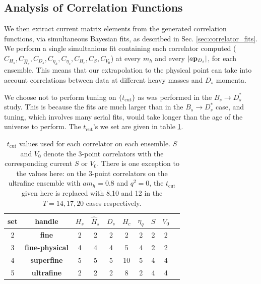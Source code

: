 \subsection{Analysis of Correlation Functions}

We then extract current matrix elements from the generated correlation functions, via simultaneous Bayesian fits, as described in Sec. \ref{sec:correlator_fits}. We perform a single simultanious fit containing each correlator computed ($C_{H_s},C_{\hat{H}_s},C_{D_s},C_{\eta_h},C_{\eta_s},C_{H_c},C_S,C_{V_0}$) at every $m_h$ and every $|a{\bf{p}}_{D_s}|$, for each ensemble. This means that our extrapolation to the physical point can take into account correlations between data at different heavy masses and $D_s$ momenta.

We choose not to perform tuning on $\{t_{\text{cut}}\}$ as was performed in the $B_s\to D_s^*$ study. This is because the fits are much larger than in the $B_s\to D_s^*$ case, and tuning, which involves many serial fits, would take longer than the age of the universe to perform. The $t_{\text{cut}}$'s we set are given in table \ref{tab:tcuts}.

\begin{table}[htb!]
  \begin{center}
    \begin{tabular}{c c c c c c c c c c}
      \hline
      set & handle & $H_s$ & $\hat{H}_s$ & $D_s$ & $H_c$ & $\eta_q$ & $S$ & $V_0$
      \\ [0.5ex]
      \hline
      2 & \bf{fine} & 2 & 2 & 2 & 2 & 2 & 2 & 2
      \\ [1ex]
      3 & \bf{fine-physical} & 4 & 4 & 4 & 5 & 4 & 2 & 2
      \\ [1ex]
      4 & \bf{superfine} & 5 & 5 & 5 & 10 & 5 & 4 & 4
      \\ [1ex]
      5 & \bf{ultrafine} & 2 & 2 & 2 & 8 & 2 & 4 & 4
      \\ [1ex]
      \hline
    \end{tabular}
  \end{center}
  \caption{$t_{\text{cut}}$ values used for each correlator on each ensemble. $S$ and $V_0$ denote the 3-point correlators with the corresponding current $S$ or $V_0$. There is one exception to the values here: on the 3-point correlators on the ultrafine ensemble with $am_h=0.8$ and $q^2=0$, the $t_{\text{cut}}$ given here is replaced with 8,10 and 12 in the $T=14,17,20$ cases respectively. \label{tab:tcuts}}
  \end{table}

